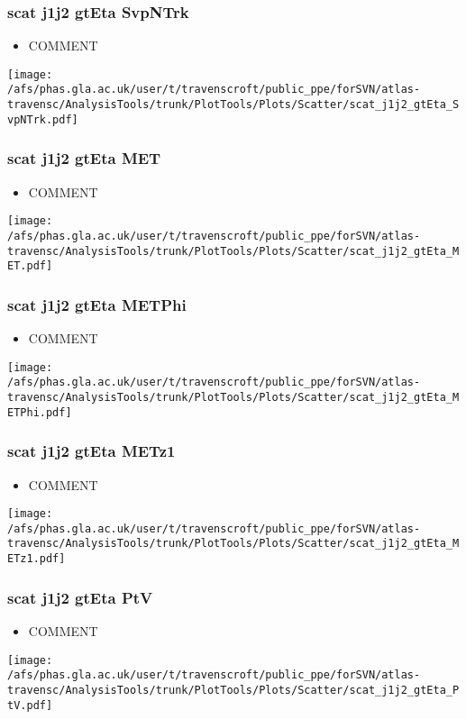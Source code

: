 \documentclass{beamer}
\begin{document}
\begin{frame}
\frametitle{scat j1j2 gtEta SvpNTrk}
\begin{itemize}
\item COMMENT
\end{itemize}
\begin{center}
\texttt{[image: /afs/phas.gla.ac.uk/user/t/travenscroft/public\_ppe/forSVN/atlas-travensc/AnalysisTools/trunk/PlotTools/Plots/Scatter/scat\_j1j2\_gtEta\_SvpNTrk.pdf]}
\end{center}
\end{frame}

\begin{frame}
\frametitle{scat j1j2 gtEta MET}
\begin{itemize}
\item COMMENT
\end{itemize}
\begin{center}
\texttt{[image: /afs/phas.gla.ac.uk/user/t/travenscroft/public\_ppe/forSVN/atlas-travensc/AnalysisTools/trunk/PlotTools/Plots/Scatter/scat\_j1j2\_gtEta\_MET.pdf]}
\end{center}
\end{frame}

\begin{frame}
\frametitle{scat j1j2 gtEta METPhi}
\begin{itemize}
\item COMMENT
\end{itemize}
\begin{center}
\texttt{[image: /afs/phas.gla.ac.uk/user/t/travenscroft/public\_ppe/forSVN/atlas-travensc/AnalysisTools/trunk/PlotTools/Plots/Scatter/scat\_j1j2\_gtEta\_METPhi.pdf]}
\end{center}
\end{frame}

\begin{frame}
\frametitle{scat j1j2 gtEta METz1}
\begin{itemize}
\item COMMENT
\end{itemize}
\begin{center}
\texttt{[image: /afs/phas.gla.ac.uk/user/t/travenscroft/public\_ppe/forSVN/atlas-travensc/AnalysisTools/trunk/PlotTools/Plots/Scatter/scat\_j1j2\_gtEta\_METz1.pdf]}
\end{center}
\end{frame}

\begin{frame}
\frametitle{scat j1j2 gtEta PtV}
\begin{itemize}
\item COMMENT
\end{itemize}
\begin{center}
\texttt{[image: /afs/phas.gla.ac.uk/user/t/travenscroft/public\_ppe/forSVN/atlas-travensc/AnalysisTools/trunk/PlotTools/Plots/Scatter/scat\_j1j2\_gtEta\_PtV.pdf]}
\end{center}
\end{frame}
\end{document}
